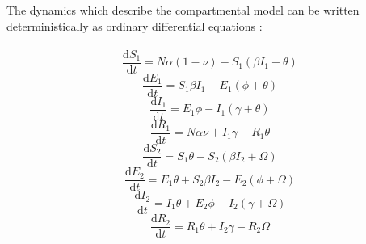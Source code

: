 \documentclass[../Paper.tex]{subfiles}
\begin{document}
The dynamics which describe the compartmental model can be written deterministically
as ordinary differential equations : \\
\\
\begin{equation} \label{eq:s1}
  \frac{\mathrm{d} S_{1}}{\mathrm{d} t} = N\alpha\left(1 - \nu \right) - S_{1}\left(\beta I_{1} + \theta \right)
\end{equation}
\begin{equation}
  \frac{\mathrm{d} E_{1}}{\mathrm{d} t} = S_{1}\beta I_{1} - E_{1}\left( \phi + \theta \right)
\end{equation}
\begin{equation}
  \frac{\mathrm{d} I_{1}}{\mathrm{d} t} = E_{1}\phi - I_{1}\left(\gamma + \theta \right)
\end{equation}
\begin{equation}
  \frac{\mathrm{d} R_{1}}{\mathrm{d} t} = N\alpha\nu + I_{1}\gamma - R_{1}\theta
\end{equation}
\begin{equation} \label{eq:s2}
  \frac{\mathrm{d} S_{2}}{\mathrm{d} t} = S_{1}\theta - S_{2}\left(\beta I_{2} + \Omega \right)
\end{equation}
\begin{equation}
  \frac{\mathrm{d} E_{2}}{\mathrm{d} t} = E_{1}\theta + S_{2}\beta I_{2} - E_{2}\left( \phi + \Omega \right)
\end{equation}
\begin{equation}
  \frac{\mathrm{d} I_{2}}{\mathrm{d} t} = I_{1}\theta + E_{2}\phi - I_{2}\left(\gamma + \Omega \right)
\end{equation}
\begin{equation}
  \frac{\mathrm{d} R_{2}}{\mathrm{d} t} = R_{1}\theta + I_{2}\gamma - R_{2}\Omega
\end{equation}
\raggedright
\clearpage
\end{document}
